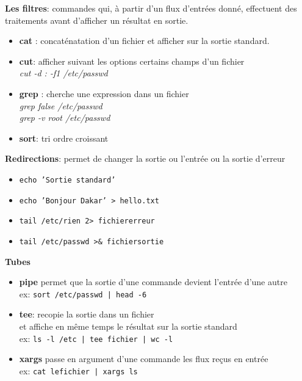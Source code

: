 \documentclass[french]{beamer}
\begin{document}
\begin{frame}
\textbf{Les filtres}: commandes qui, à partir d'un flux d'entrées donné,
effectuent des traitements avant d'afficher un résultat en sortie.
    \begin{itemize}
    \item \textbf{cat} : concaténatation d'un fichier et afficher sur la sortie
    standard. \\
    \item \textbf{cut}: afficher suivant les options certains champs d'un
    fichier \\
    \textit{cut -d : -f1 /etc/passwd}
    \item \textbf{grep} : cherche une expression dans un fichier \\
    \textit{grep false /etc/passwd} \\
    \textit{grep -v root /etc/passwd} \\
    \item \textbf{sort}: tri ordre croissant
    \end{itemize}
\end{frame}


\begin{frame}
\textbf{Redirections}: permet de changer la sortie ou l'entrée ou la sortie d'erreur \\
    \begin{itemize}
    \item \texttt{echo 'Sortie standard'}
    \item \texttt{echo 'Bonjour Dakar' > hello.txt}
    \item \texttt{tail /etc/rien 2> fichiererreur }
    \item \texttt{tail /etc/passwd >\& fichiersortie }
    \end{itemize}
\end{frame}


\begin{frame}
\textbf{Tubes}
    \begin{itemize}
    \item \textbf{pipe} permet que la sortie d'une commande devient l'entrée
    d'une autre \\
    ex: \texttt{sort /etc/passwd | head -6}
    \item \textbf{tee}: recopie la sortie dans un fichier \\et affiche en même
    temps le résultat sur la sortie standard \\
    ex: \texttt{ls -l /etc | tee fichier | wc  -l}
    \item \textbf{xargs} passe en argument d'une commande les flux reçus en
    entrée\\
    ex: \texttt{cat lefichier | xargs ls}

    \end{itemize}
\end{frame}
\end{document}
